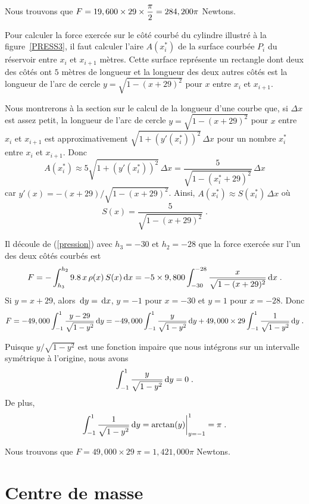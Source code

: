 {\begin{egg}
Nous trouvons que
$\displaystyle F = 19,600\times 29 \times \frac{\pi}{2} = 284,200\pi$
Newtons.


Pour calculer la force exercée sur le côté courbé du cylindre illustré à la
figure~\ref{PRESS3}, il faut calculer l'aire $A(x_i^\ast)$ de la surface
courbée $P_i$ du réservoir entre $x_i$ et $x_{i+1}$ mètres.  Cette surface
représente un rectangle dont deux des côtés ont $5$ mètres de longueur et la
longueur des deux autres côtés est la longueur de l'arc de cercle
$y=\sqrt{1-(x+29)^2}$ pour $x$ entre $x_i$ et $x_{i+1}$.

Nous montrerons à la section sur le calcul de la longueur d'une courbe que, si
$\Delta x$ est assez petit, la longueur de l'arc de cercle
$y=\sqrt{1-(x+29)^2}$ pour $x$ entre $x_i$ et $x_{i+1}$ est approximativement
$\sqrt{1+(y'(x_i^\ast))^2} \, \Delta x$ pour un nombre $x_i^\ast$ entre $x_i$
et $x_{i+1}$.  Donc
\[
A(x_i^\ast) \approx 5 \sqrt{1+(y'(x_i^\ast))^2} \, \Delta x
= \frac{5}{\sqrt{1-(x_i^\ast+29)^2}} \, \Delta x
\]
car $y'(x) = -(x+29)/\sqrt{1-(x+29)^2}$.
Ainsi, $A(x_i^\ast) \approx S(x_i^\ast) \, \Delta x$ où
\[
S(x) = \frac{5}{\sqrt{1-(x+29)^2}} \; .
\]

Il découle de (\ref{pression}) avec $h_3 = -30$ et $h_2 = -28$ que la
force exercée sur l'un des deux côtés courbés est
\[
F = -\int_{h_3}^{h_2} 9.8 \, x\, \rho(x)\, S(x)\,\mathrm{d}x
= - 5\times 9,800 \int_{-30}^{-28} \frac{x}{\sqrt{1-(x+29)^2}} \,\mathrm{d}x \; .
\]
Si $y = x+29$, alors $\,\mathrm{d}y = \,\mathrm{d}x$, $y=-1$ pour $x=-30$
et $y=1$ pour $x=-28$.  Donc
\[
F = -49,000 \int_{-1}^{1} \frac{y-29}{\sqrt{1-y^2}} \,\mathrm{d}y
= - 49,000 \int_{-1}^{1} \frac{y}{\sqrt{1-y^2}} \,\mathrm{d}y
+ 49,000\times 29 \int_{-1}^{1} \frac{1}{\sqrt{1-y^2}} \,\mathrm{d}y \; .
\]

Puisque $y/\sqrt{1-y^2}$ est une fonction impaire que nous intégrons sur un
intervalle symétrique à l'origine, nous avons
\[
\int_{-1}^{1} \frac{y}{\sqrt{1-y^2}} \,\mathrm{d}y = 0 \; .
\]
De plus,
\[
\int_{-1}^{1} \frac{1}{\sqrt{1-y^2}} \,\mathrm{d}y =
\arctan(y)\bigg|_{y=-1}^1 = \pi \; .
\]

Nous trouvons que $F = 49,000\times 29 \; \pi = 1,421,000\pi$ Newtons.
\end{egg}

\section{Centre de masse \eng}

}
